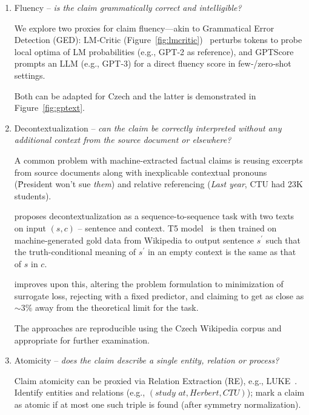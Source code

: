 \begin{enumerate}
    \item {\techbf Fluency} -- \textit{is the claim grammatically correct and intelligible?}
    
    We explore two proxies for claim fluency—akin to Grammatical Error Detection (GED): \textsf{LM‑Critic} (Figure~\ref{fig:lmcritic})~\cite{yasunaga-etal-2021-lm} perturbs tokens to probe local optima of LM probabilities (e.g., GPT‑2 as reference), and \textsf{GPTScore}~\cite{fu2023gptscore} prompts an LLM (e.g., GPT‑3) for a direct fluency score in few‑/zero‑shot settings.
    
    Both can be adapted for Czech and the latter is demonstrated in Figure~\ref{fig:gptext}.
    \item {\techbf Decontextualization} -- \textit{can the claim be correctly interpreted without any additional context from the source document or elsewhere?}
    
    A common problem with machine-extracted factual claims is reusing excerpts from source documents along with inexplicable contextual pronouns (\"{President won't sue \textit{them}}) and relative referencing (\"{\textit{Last year}, CTU had 23K students}).

\cite{choi-etal-2021-decontextualization} proposes decontextualization as a sequence-to-sequence task with two texts on input $(s,c)$ -- sentence and context.
    T5 model~\cite{t5-11b} is then trained on machine-generated gold data from Wikipedia to output sentence $s^\prime$ such that the truth-conditional meaning of $s^\prime$ in an empty context is the same as that of $s$ in $c$.

    \cite{mohri2023learning} improves upon this, altering the problem formulation to minimization of surrogate loss, rejecting with a fixed predictor, and claiming to get as close as $\sim3\%$ away from the theoretical limit for the task.

    The approaches are reproducible using the Czech Wikipedia corpus and appropriate for further examination.

    \item {\techbf Atomicity} --  \textit{does the claim describe a single entity, relation or process?}
    \label{atomicity}
    
    Claim atomicity can be proxied via Relation Extraction (RE), e.g., LUKE~\cite{yamada2020luke}. Identify entities and relations (e.g., $(\textit{study at}, \textit{Herbert}, \textit{CTU})$); mark a claim as atomic if at most one such triple is found (after symmetry normalization).


\end{enumerate}
